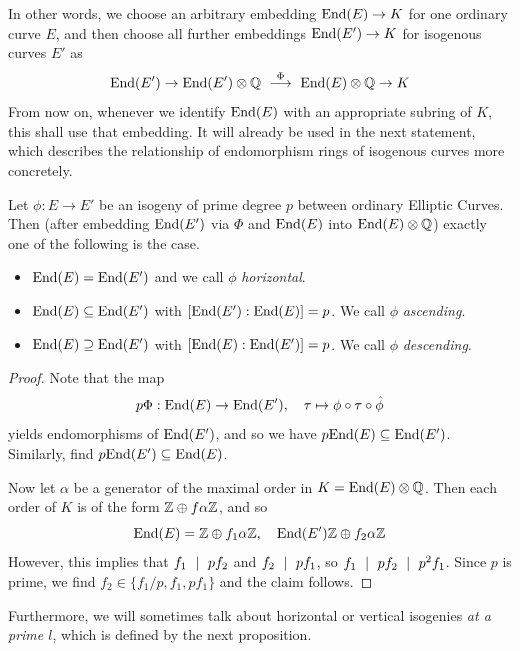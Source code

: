 In other words, we choose an arbitrary embedding $\mathrm{End}(E) \to K$ for one ordinary curve $E$, and then choose all further embeddings $\mathrm{End}(E') \to K$ for isogenous curves $E'$ as
\begin{equation*}
    \End(E') \to \End(E') \otimes \Q \ \overset{\Phi}{\longrightarrow} \ \End(E) \otimes \Q \to K
\end{equation*}
From now on, whenever we identify $\mathrm{End}(E)$ with an appropriate subring of $K$, this shall use that embedding.
It will already be used in the next statement, which describes the relationship of endomorphism rings of isogenous curves more concretely.
\begin{prop}
    Let $\phi: E \to E'$ be an isogeny of prime degree $p$ between ordinary Elliptic Curves.
    Then (after embedding $\mathrm{End}(E')$ via $\Phi$ and $\mathrm{End}(E)$ into $\mathrm{End}(E) \otimes \mathbb{Q}$) exactly one of the following is the case.
    \begin{itemize}
        \item $\mathrm{End}(E) = \mathrm{End}(E')$ and we call $\phi$ \emph{horizontal}.
        \item $\mathrm{End}(E) \subseteq \mathrm{End}(E')$ with $[\mathrm{End}(E') : \mathrm{End}(E)] = p$. We call $\phi$ \emph{ascending}.
        \item $\mathrm{End}(E) \supseteq \mathrm{End}(E')$ with $[\mathrm{End}(E) : \mathrm{End}(E')] = p$. We call $\phi$ \emph{descending}.
    \end{itemize}
\end{prop}
\begin{proof}
    Note that the map
    \begin{equation*}
        p\Phi: \mathrm{End}(E) \to \mathrm{End}(E'), \quad \tau \mapsto \phi \circ \tau \circ \hat{\phi}
    \end{equation*}
    yields endomorphisms of $\mathrm{End}(E')$, and so we have $p\mathrm{End}(E) \subseteq \mathrm{End}(E')$.
    Similarly, find $p\mathrm{End}(E') \subseteq \mathrm{End}(E)$.

    Now let $\alpha$ be a generator of the maximal order in $K = \mathrm{End}(E) \otimes \mathbb{Q}$.
    Then each order of $K$ is of the form $\mathbb{Z} \oplus f\alpha\mathbb{Z}$, and so
    \begin{equation*}
        \mathrm{End}(E) = \mathbb{Z} \oplus f_1\alpha\mathbb{Z}, \quad \mathrm{End}(E') \mathbb{Z} \oplus f_2\alpha\mathbb{Z}
    \end{equation*}
    However, this implies that $f_1 \ \mid \  pf_2$ and $f_2 \ \mid \  pf_1$, so $f_1 \ \mid \  p f_2 \ \mid \  p^2 f_1$.
    Since $p$ is prime, we find $f_2 \in \{ f_1/p, f_1, p f_1 \}$ and the claim follows.
\end{proof}
Furthermore, we will sometimes talk about horizontal or vertical isogenies \emph{at a prime $l$}, which is defined by the next proposition.
